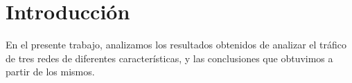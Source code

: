 \section{Introducción}

En el presente trabajo, analizamos los resultados obtenidos de analizar el
tráfico de tres redes de diferentes características, y las conclusiones que
obtuvimos a partir de los mismos.
